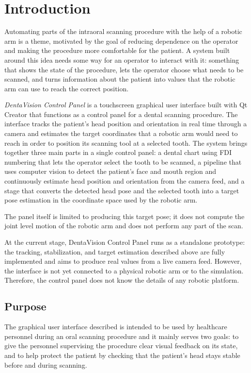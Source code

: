 \section{Introduction}
Automating parts of the intraoral scanning procedure with the help of a robotic arm is a theme, motivated by the goal of reducing dependence on the operator and making the procedure more comfortable for the patient. 
A system built around this idea needs some way for an operator to interact with it: something that shows the state of the procedure, lets the operator choose what needs to be scanned, and turns information about the patient into values that the robotic arm can use to reach the correct position.

\textit{DentaVision Control Panel} is a touchscreen graphical user interface built with Qt Creator that functions as a control panel for a dental scanning procedure. 
The interface tracks the patient's head position and orientation in real time through a camera and estimates the target coordinates that a robotic arm would need to reach in order to position its scanning tool at a selected tooth.
The system brings together three main parts in a single control panel: a dental chart using FDI numbering that lets the operator select the tooth to be scanned, 
a pipeline that uses computer vision to detect the patient's face 
and mouth region and continuously estimate head position and orientation from the camera feed, 
and a stage that converts the detected head pose and the selected tooth into a target pose estimation in the coordinate space used by the robotic arm.

The panel itself is limited to producing this target pose; it does not compute the joint level motion of the robotic arm and does not perform any part of the scan. 

At the current stage, DentaVision Control Panel runs as a standalone prototype: the tracking, stabilization, and target estimation described above are fully implemented and aims to produce real values from a live camera feed. However, the interface is not yet connected to a physical robotic arm or to the simulation. Therefore, the control panel does not know the details of any robotic platform.
\subsection{Purpose}
The graphical user interface described is intended to be used by healthcare personnel during an oral scanning procedure and it mainly serves two goals: to give the personnel supervising the procedure clear visual feedback on its state, and to help protect the patient by checking that the patient's head stays stable before and during scanning.

